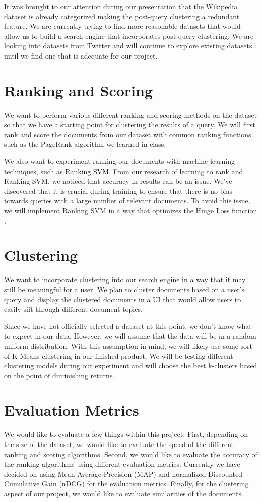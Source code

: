\documentclass[sigconf]{acmart}
\begin{document}
It was brought to our attention during our presentation that the Wikipedia dataset is already categorized making the post-query clustering a redundant feature. We are currently trying to find more reasonable datasets that would allow us to build a search engine that incorporates post-query clustering. We are looking into datasets from Twitter and will continue to explore existing datasets until we find one that is adequate for our project.

\section{Ranking and Scoring}
We want to perform various different ranking and scoring methods on the dataset so that we have a starting point for clustering the results of a query. We will first rank and score the documents from our dataset with common ranking functions such as the PageRank algorithm we learned in class.


We also want to experiment ranking our documents with machine learning techniques, such as Ranking SVM. From our research of learning to rank and Ranking SVM, we noticed that accuracy in results can be an issue. We've discovered that it is crucial during training to ensure that there is no bias towards queries with a large number of relevant documents. To avoid this issue, we will implement Ranking SVM in a way that optimizes the Hinge Loss function \cite{one}.

\section{Clustering}
We want to incorporate clustering into our search engine in a way that it may still be meaningful for a user. We plan to cluster documents based on a user's query and display the clustered documents in a UI that would allow users to easily sift through different document topics.

Since we have not officially selected a dataset at this point, we don't know what to expect in our data. However, we will assume that the data will be in a random uniform distribution. With this assumption in mind, we will likely use some sort of K-Means clustering in our finished product. We will be testing different clustering models during our experiment and will choose the best k-clusters based on the point of diminishing returns. 


\section{Evaluation Metrics}
We would like to evaluate a few things within this project. First, depending on the size of the dataset, we would like to evaluate the speed of the different ranking and scoring algorithms. Second, we would like to evaluate the accuracy of the ranking algorithms using different evaluation metrics. Currently we have decided on using Mean Average Precision (MAP) and normalized Discounted Cumulative Gain (nDCG) for the evaluation metrics. Finally, for the clustering aspect of our project, we would like to evaluate similarities of the documents.
\end{document}
